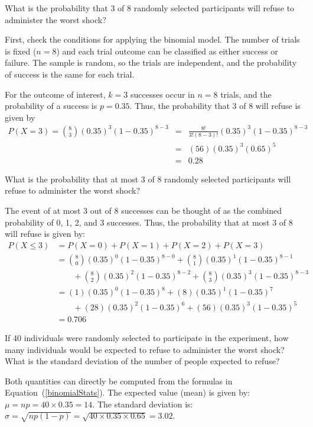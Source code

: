 \begin{example}{What is the probability that 3 of 8 randomly selected participants will refuse to administer the worst shock?}
	
	First, check the conditions for applying the binomial model. The number of trials is fixed ($n=8$) and each trial outcome can be classified as either success or failure. The sample is random, so the trials are independent, and the probability of success is the same for each trial. 
	
	For the outcome of interest, $k=3$ successes occur in $n=8$ trials, and the probability of a success is $p=0.35$. Thus, the probability that 3 of 8 will refuse is given by
	\begin{eqnarray*}
		P(X =3) = { 8 \choose 3}(0.35)^3(1-0.35)^{8-3}
		&=& \frac{8!}{3!(8-3)!}(0.35)^3(1-0.35)^{8-3} \\
		&=& (56)(0.35)^3(0.65)^5 \\
		&=& 0.28
	\end{eqnarray*}
\end{example}

\begin{example}{What is the probability that at most 3 of 8 randomly selected participants will refuse to administer the worst shock?}
	
	The event of at most 3 out of 8 successes can be thought of as the combined probability of 0, 1, 2, and 3 successes. Thus, the probability that at most 3 of 8 will refuse is given by:
	\begin{align*}
	P(X \leq 3) &= P(X = 0) + P(X = 1) + P(X = 2) + P(X = 3) \\
	&= { 8 \choose 0}(0.35)^0(1-0.35)^{8-0} + { 8 \choose 1}(0.35)^1(1-0.35)^{8-1} \\
	& \qquad + { 8 \choose 2}(0.35)^2(1-0.35)^{8-2} + { 8 \choose 3}(0.35)^3(1-0.35)^{8-3} \\
	&= (1)(0.35)^0(1-0.35)^{8} + (8)(0.35)^1(1-0.35)^{7} \\
	& \qquad + (28)(0.35)^2(1-0.35)^{6} + (56)(0.35)^3(1-0.35)^{5}\\
	&= 0.706
	\end{align*}
\end{example}

\begin{example}{If 40 individuals were randomly selected to participate in the experiment, how many individuals would be expected to refuse to administer the worst shock? What is the standard deviation of the number of people expected to refuse?}
	
	Both quantities can directly be computed from the formulas in Equation~(\ref{binomialStats}). The expected value (mean) is given by: $\mu=np = 40\times 0.35 = 14$. The standard deviation is: $\sigma = \sqrt{np(1-p)} = \sqrt{40\times 0.35\times 0.65} = 3.02$.
\end{example}

